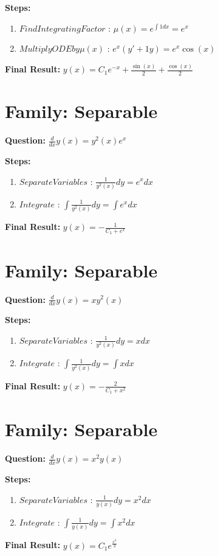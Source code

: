 \documentclass{article}
\begin{document}
\textbf{Steps:}
\begin{enumerate}
\item $Find Integrating Factor$ :  $\mu(x) = e^{\int 1 dx} = e^{x}$
\item $Multiply ODE by \mu(x)$ :  $e^{x}(y' + 1y) = e^{x} \cos{\left(x \right)}$
\end{enumerate}
\textbf{Final Result:} $y{\left(x \right)} = C_{1} e^{- x} + \frac{\sin{\left(x \right)}}{2} + \frac{\cos{\left(x \right)}}{2}$

\section*{Family: Separable}
\textbf{Question:} $\frac{d}{d x} y{\left(x \right)} = y^{2}{\left(x \right)} e^{x}$

\textbf{Steps:}
\begin{enumerate}
\item $Separate Variables$ :  $\frac{1}{y^{2}{\left(x \right)}} dy = e^{x} dx$
\item $Integrate$ :  $\int \frac{1}{y^{2}{\left(x \right)}} dy = \int e^{x} dx$
\end{enumerate}
\textbf{Final Result:} $y{\left(x \right)} = - \frac{1}{C_{1} + e^{x}}$

\section*{Family: Separable}
\textbf{Question:} $\frac{d}{d x} y{\left(x \right)} = x y^{2}{\left(x \right)}$

\textbf{Steps:}
\begin{enumerate}
\item $Separate Variables$ :  $\frac{1}{y^{2}{\left(x \right)}} dy = x dx$
\item $Integrate$ :  $\int \frac{1}{y^{2}{\left(x \right)}} dy = \int x dx$
\end{enumerate}
\textbf{Final Result:} $y{\left(x \right)} = - \frac{2}{C_{1} + x^{2}}$

\section*{Family: Separable}
\textbf{Question:} $\frac{d}{d x} y{\left(x \right)} = x^{2} y{\left(x \right)}$

\textbf{Steps:}
\begin{enumerate}
\item $Separate Variables$ :  $\frac{1}{y{\left(x \right)}} dy = x^{2} dx$
\item $Integrate$ :  $\int \frac{1}{y{\left(x \right)}} dy = \int x^{2} dx$
\end{enumerate}
\textbf{Final Result:} $y{\left(x \right)} = C_{1} e^{\frac{x^{3}}{3}}$
\end{document}
